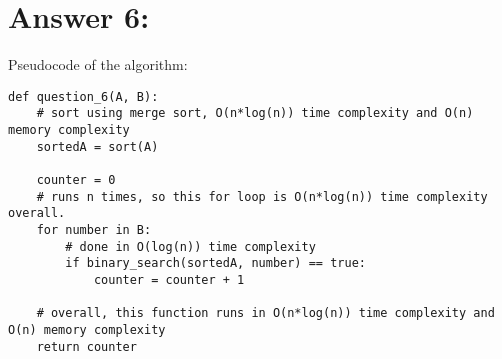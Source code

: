 \documentclass{article}
\begin{document}
\section{Answer 6:}
Pseudocode of the algorithm:
\begin{verbatim}
def question_6(A, B):
    # sort using merge sort, O(n*log(n)) time complexity and O(n) memory complexity
    sortedA = sort(A) 
    
    counter = 0
    # runs n times, so this for loop is O(n*log(n)) time complexity overall.
    for number in B: 
        # done in O(log(n)) time complexity
        if binary_search(sortedA, number) == true: 
            counter = counter + 1

    # overall, this function runs in O(n*log(n)) time complexity and O(n) memory complexity
    return counter 
        
\end{verbatim}
\end{document}
